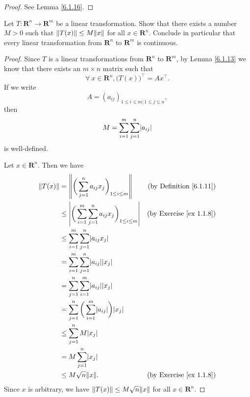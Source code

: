 \begin{proof}
    See Lemma \ref{6.1.16}.
\end{proof}

\begin{exercise}\label{ex 6.1.4}
    Let \(T : \mathbf{R}^n \to \mathbf{R}^m\) be a linear transformation.
    Show that there exists a number \(M > 0\) such that \(\norm*{T(x)} \leq M \norm*{x}\) for all \(x \in \mathbf{R}^n\).
    Conclude in particular that every linear transformation from \(\mathbf{R}^n\) to \(\mathbf{R}^m\) is continuous.
\end{exercise}

\begin{proof}
    Since \(T\) is a linear transformations from \(\mathbf{R}^n\) to \(\mathbf{R}^m\), by Lemma \ref{6.1.13} we know that there exists an \(m \times n\) matrix such that
    \[
        \forall\ x \in \mathbf{R}^n, \big(T(x)\big)^\top = Ax^\top.
    \]
    If we write
    \[
        A = (a_{ij})_{1 \leq i \leq m ; 1 \leq j \leq n},
    \]
    then
    \[
        M = \sum_{i = 1}^m \sum_{j = 1}^n \abs*{a_{ij}}
    \]
    is well-defined.

    Let \(x \in \mathbf{R}^n\).
    Then we have
    \begin{align*}
        \norm*{T(x)} & = \norm*{\bigg(\sum_{j = 1}^n a_{ij} x_j\bigg)_{1 \leq i \leq m}}                  & \text{(by Definition \ref{6.1.11})} \\
                     & \leq \abs*{\bigg(\sum_{i = 1}^m \sum_{j = 1}^n a_{ij} x_j\bigg)_{1 \leq i \leq m}} & \text{(by Exercise \ref{ex 1.1.8})} \\
                     & \leq \sum_{i = 1}^m \sum_{j = 1}^n \abs*{a_{ij} x_j}                                                                     \\
                     & = \sum_{i = 1}^m \sum_{j = 1}^n \abs*{a_{ij}} \abs*{x_j}                                                                 \\
                     & = \sum_{j = 1}^n \sum_{i = 1}^m \abs*{a_{ij}} \abs*{x_j}                                                                 \\
                     & = \sum_{j = 1}^n \bigg(\sum_{i = 1}^m \abs*{a_{ij}}\bigg) \abs*{x_j}                                                     \\
                     & \leq \sum_{j = 1}^n M \abs*{x_j}                                                                                         \\
                     & = M \sum_{j = 1}^n \abs*{x_j}                                                                                            \\
                     & \leq M \sqrt{n} \norm*{x}.                                                         & \text{(by Exercise \ref{ex 1.1.8})}
    \end{align*}
    Since \(x\) is arbitrary, we have \(\norm*{T(x)} \leq M \sqrt{n} \norm*{x}\) for all \(x \in \mathbf{R}^n\).


\end{proof}
